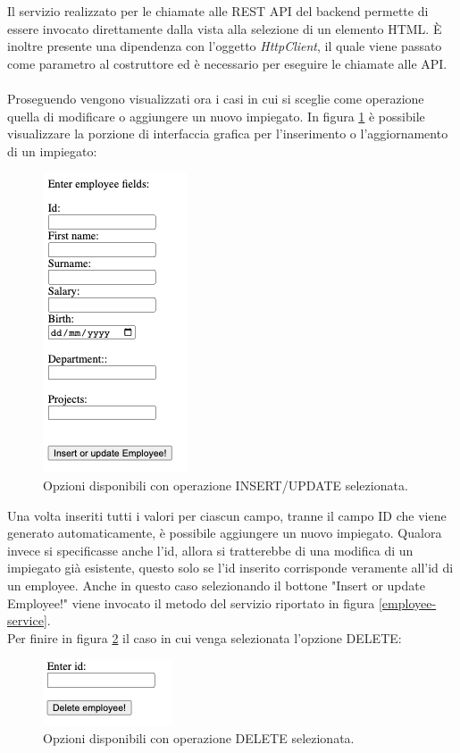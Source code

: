 \FloatBarrier
Il servizio realizzato per le chiamate alle REST API del backend permette di essere invocato direttamente dalla vista alla selezione di un elemento HTML. È inoltre presente una dipendenza con l'oggetto \textit{HttpClient}, il quale viene passato come parametro al costruttore ed è necessario per eseguire le chiamate alle API.\\\\
Proseguendo vengono visualizzati ora i casi in cui si sceglie come operazione quella di modificare o aggiungere un nuovo impiegato. In figura \ref{post-employee} è possibile visualizzare la porzione di interfaccia grafica per l'inserimento o l'aggiornamento di un impiegato:
\FloatBarrier
\begin{figure}[!ht]
\centering
\includegraphics[width=0.3\linewidth]{immagini/postEmployee.png}
\caption{Opzioni disponibili con operazione INSERT/UPDATE selezionata.}
\label{post-employee}
\end{figure}
\FloatBarrier
Una volta inseriti tutti i valori per ciascun campo, tranne il campo ID che viene generato automaticamente, è possibile aggiungere un nuovo impiegato. Qualora invece si specificasse anche l'id, allora si tratterebbe di una modifica di un impiegato già esistente, questo solo se l'id inserito corrisponde veramente all'id di un employee. Anche in questo caso selezionando il bottone "Insert or update Employee!" viene invocato il metodo del servizio riportato in figura \ref{employee-service}.\\
Per finire in figura \ref{delete-employee} il caso in cui venga selezionata l'opzione DELETE:
\FloatBarrier
\begin{figure}[!ht]
\centering
\includegraphics[width=0.3\linewidth]{immagini/deleteEmployee.png}
\caption{Opzioni disponibili con operazione DELETE selezionata.}
\label{delete-employee}
\end{figure}
\FloatBarrier
